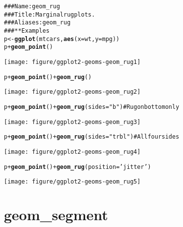 \documentclass[a4paper,titlepage]{tufte-handout}\usepackage{graphicx, color}
\makeatletter
\def\maxwidth{ %
  \ifdim\Gin@nat@width>\linewidth
    \linewidth
  \else
    \Gin@nat@width
  \fi
}
\newcommand{\hlfunctioncall}[1]{\textcolor[rgb]{0.501960784313725,0,0.329411764705882}{\textbf{#1}}}%
\newcommand{\hlstring}[1]{\textcolor[rgb]{0.6,0.6,1}{#1}}%
\newcommand{\hlcomment}[1]{\textcolor[rgb]{0.180392156862745,0.6,0.341176470588235}{#1}}%
\newenvironment{kframe}{%
 \def\at@end@of@kframe{}%
 \ifinner\ifhmode%
  \def\at@end@of@kframe{\end{minipage}}%
  \begin{minipage}{\columnwidth}%
 \fi\fi%
 \def\FrameCommand##1{\hskip\@totalleftmargin \hskip-\fboxsep
 \colorbox{shadecolor}{##1}\hskip-\fboxsep
     \hskip-\linewidth \hskip-\@totalleftmargin \hskip\columnwidth}%
 \MakeFramed {\advance\hsize-\width
   \@totalleftmargin\z@ \linewidth\hsize
   \@setminipage}}%
 {\par\unskip\endMakeFramed%
 \at@end@of@kframe}
\newenvironment{knitrout}{}{} %
\makeatother
\begin{document}
\begin{knitrout}
\color{fgcolor}\begin{kframe}
\begin{alltt}
\hlcomment{### Name: geom_rug}
\hlcomment{### Title: Marginal rug plots.}
\hlcomment{### Aliases: geom_rug}
\hlcomment{### ** Examples}
p <- \hlfunctioncall{ggplot}(mtcars, \hlfunctioncall{aes}(x=wt, y=mpg))
p + \hlfunctioncall{geom_point}()
\end{alltt}
\end{kframe}\texttt{[image: figure/ggplot2-geoms-geom\_rug1]} \begin{kframe}\begin{alltt}
p + \hlfunctioncall{geom_point}() + \hlfunctioncall{geom_rug}()
\end{alltt}
\end{kframe}\texttt{[image: figure/ggplot2-geoms-geom\_rug2]} \begin{kframe}\begin{alltt}
p + \hlfunctioncall{geom_point}() + \hlfunctioncall{geom_rug}(sides=\hlstring{"b"})    # Rug on bottom only
\end{alltt}
\end{kframe}\texttt{[image: figure/ggplot2-geoms-geom\_rug3]} \begin{kframe}\begin{alltt}
p + \hlfunctioncall{geom_point}() + \hlfunctioncall{geom_rug}(sides=\hlstring{"trbl"}) # All four sides
\end{alltt}
\end{kframe}\texttt{[image: figure/ggplot2-geoms-geom\_rug4]} \begin{kframe}\begin{alltt}
p + \hlfunctioncall{geom_point}() + \hlfunctioncall{geom_rug}(position=\hlstring{'jitter'})
\end{alltt}
\end{kframe}\texttt{[image: figure/ggplot2-geoms-geom\_rug5]} 
\end{knitrout}


\section{geom\_segment}
\end{document}
